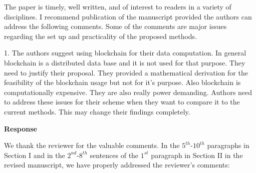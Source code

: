 \documentclass[12pt,draftcls, onecolumn]{IEEEtran}
\begin{document}
The paper is timely, well written, and of interest to readers in a variety of disciplines. I recommend publication of the manuscript provided the authors can address the following comments. Some of the comments are major issues regarding the set up and practicality of the proposed methods.

1. The authors suggest using blockchain for their data computation. In general blockchain is a distributed data base and it is not used for that purpose. They need to justify their proposal. They provided a mathematical derivation for the feasibility of the blockchain usage but not for it's purpose. Also blockchain is computationally expensive. They are also really power demanding. Authors need to address these issues for their scheme when they want to compare it to the current methods. This may change their findings completely.

\vspace{3mm} \noindent\textcolor[rgb]{0.00,0.00,1.00}{\textbf{Response}}
\vspace{2mm}

We thank the reviewer for the valuable comments. In the $5^{th}$-$10^{th}$ paragraphs in Section I and in the $2^{nd}$-$8^{th}$ sentences of the $1^{st}$ paragraph in Section II in the revised manuscript, we have properly addressed the reviewer's comments:
\end{document}
